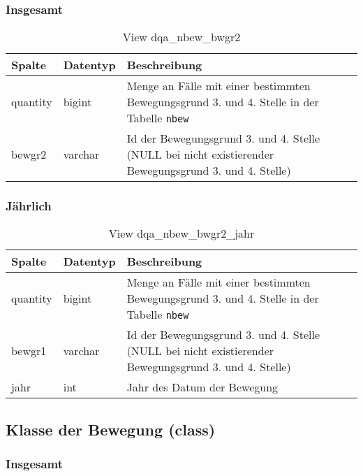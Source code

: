 \subsubsection{Insgesamt} \label{subsubsec:bewg2I}

\begin{table}[ht]
	\centering   
	\caption{View dqa\_nbew\_bwgr2}
	\label{tab:bewG2I}
	\begin{tabular}{||l|l|p{10cm}||}   		
		\hline
		Spalte & Datentyp & Beschreibung \\ [0.5ex]
		\hline\hline
		quantity & bigint & Menge an Fälle mit einer bestimmten Bewegungsgrund 3. und 4. Stelle in der Tabelle \texttt{nbew} \\
		\hline
		bewgr2 & varchar & Id der Bewegungsgrund 3. und 4. Stelle (NULL bei nicht existierender Bewegungsgrund 3. und 4. Stelle)\\
		\hline
		
	\end{tabular}
\end{table}

\newpage

\subsubsection{Jährlich} \label{subsubsec:bewg2J}

\begin{table}[ht]
	\centering   
	\caption{View dqa\_nbew\_bwgr2\_jahr}
	\label{tab:bewG2J}
	\begin{tabular}{||l|l|p{10cm}||}   		
		\hline
		Spalte & Datentyp & Beschreibung \\ [0.5ex]
		\hline\hline
		quantity & bigint & Menge an Fälle mit einer bestimmten Bewegungsgrund 3. und 4. Stelle in der Tabelle \texttt{nbew}\\
		\hline
		bewgr1 & varchar & Id der Bewegungsgrund 3. und 4. Stelle (NULL bei nicht existierender Bewegungsgrund 3. und 4. Stelle)\\
		\hline
		jahr & int &  Jahr des Datum der Bewegung \\
		\hline		
	\end{tabular}
\end{table}

\subsection{Klasse der Bewegung (class)} \label{subsec:bewclass}

\subsubsection{Insgesamt} \label{subsubsec:bewClassI}

